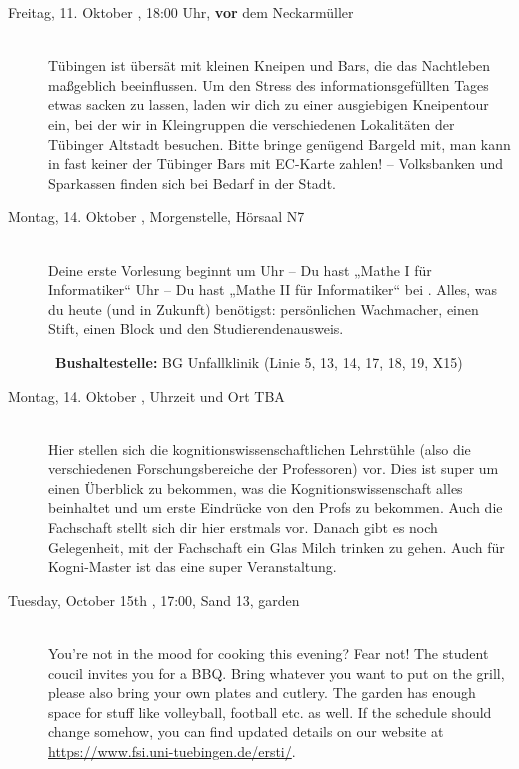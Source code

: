 \begin{description}
	\else
	\item[Freitag, 11. Oktober \YEAR, 18:00 Uhr, \textbf{vor} dem Neckarmüller]\ \\
        Tübingen ist übersät mit kleinen Kneipen und Bars, die das Nachtleben maßgeblich beeinflussen. Um den Stress des informationsgefüllten Tages etwas sacken zu lassen, laden wir dich zu einer ausgiebigen Kneipentour ein, bei der wir in Kleingruppen die verschiedenen Lokalitäten der Tübinger Altstadt besuchen. Bitte bringe genügend Bargeld mit, man kann in fast keiner der Tübinger Bars mit EC-Karte zahlen! -- Volksbanken und Sparkassen finden sich bei Bedarf in der Stadt.

	\fi

\ifbachelor
\item[Montag, 14. Oktober \YEAR, Morgenstelle, Hörsaal N7]\ \\
Deine erste Vorlesung beginnt um
 Uhr -- Du hast „Mathe I für Informatiker“  \fi
{} Uhr -- Du hast „Mathe II für Informatiker“  \fi
bei \Matheprof.
Alles, was du heute (und in Zukunft) benötigst: persönlichen Wachmacher, einen Stift, einen Block und den Studierendenausweis.

~\textbf{Bushaltestelle:} BG Unfallklinik (Linie 5, 13, 14, 17, 18, 19, X15)
\fi


\ifkogwiss
\item[Montag, 14. Oktober \YEAR, Uhrzeit und Ort TBA]\ \\
    Hier stellen sich die kognitionswissenschaftlichen Lehrstühle (also die verschiedenen Forschungsbereiche der Professoren) vor. Dies ist super um einen Überblick zu bekommen, was die Kognitionswissenschaft alles beinhaltet und um erste Eindrücke von den Profs zu bekommen. Auch die Fachschaft stellt sich dir hier erstmals vor. Danach gibt es noch Gelegenheit, mit der Fachschaft ein Glas Milch trinken zu gehen. Auch für Kogni-Master ist das eine super Veranstaltung.
\fi

\ifml
	\item[Tuesday, October 15th \YEAR, 17:00, Sand 13, garden]\ \\
	You're not in the mood for cooking this evening? Fear not! The student coucil invites you for a BBQ. Bring whatever you want to put on the grill, please also bring your own plates and cutlery. The garden has enough space for stuff like volleyball, football etc. as well.
	If the schedule should change somehow, you can find updated details on our website at \url{https://www.fsi.uni-tuebingen.de/ersti/}.


\end{description}
